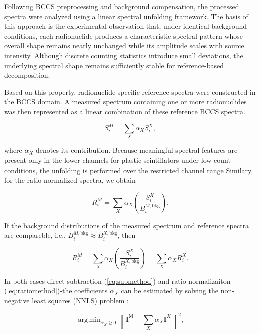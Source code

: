 \documentclass[10pt]{wlscirep}
\DeclareMathOperator*{\argmin}{arg\,min} %
\begin{document}
Following BCCS preprocessing and background compensation, the processed spectra were analyzed using a linear spectral unfolding framework. The basis of this approach is the experimental observation that, under identical background conditions, each radionuclide produces a characteristic spectral pattern whose overall shape remains nearly unchanged while its amplitude scales with source intensity. Although discrete counting statistics introduce small deviations, the underlying spectral shape remains sufficiently stable for reference-based decomposition.

Based on this property, radionuclide-specific reference spectra were constructed in the BCCS domain. A measured spectrum containing one or more radionuclides was then represented as a linear combination of these reference BCCS spectra.

\begin{equation}
S_i^M = \sum_X \alpha_X S_i^X,\label{eq:submethod}
\end{equation}

\noindent where $\alpha_X$ denotes its contribution. Because meaningful spectral features are present only in the lower channels for plastic scintillators under low-count conditions, the unfolding is performed over the restricted channel range Similary, for the ratio-normalized spectra, we obtain

\begin{equation*}
R_i^M = \sum_X \alpha_X \left(\dfrac{S_i^X}{B_i^{M,\text{bkg}}}\right).
\end{equation*}

If the background distributions of the measured spectrum and reference spectra are compareble, i.e., $B^{M,\text{bkg}}_i \approx B_i^{X,\text{bkg}}$, then

\begin{equation}
R_i^M = \sum_X \alpha_X \left(\dfrac{S_i^X}{B_i^{X,\text{bkg}}}\right) = \sum_X \alpha_X R_i^X.\label{eq:ratiomethod}
\end{equation}

In both cases-direct subtraction (\ref{eq:submethod}) and ratio normalizaiton (\ref{eq:ratiomethod})-the coefficients $\alpha_X$ can be estimated by solving the non-negative least squares (NNLS) problem :

\begin{equation}
\argmin_{\alpha_X \ge 0} \left\| \textbf{I}^{\text{M}} - \sum_{X} \alpha_X \textbf{I}^{X}\right\|^2,\label{eqn:llns}
\end{equation}
\end{document}
